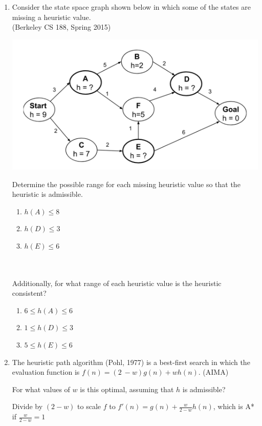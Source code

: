 \documentclass[11pt]{article}
\begin{document}
\begin{enumerate}
\newpage
\item
Consider the state space graph shown below in which some of the states are
missing a heuristic value.  \\(Berkeley CS 188, Spring 2015)


\includegraphics[width=\textwidth]{img/Heuristics}

Determine the possible range for each missing heuristic value so that the heuristic is admissible. 
~\\
\begin{enumerate}
\color{blue}
\item $h(A) \le 8$

\item $h(D) \le 3$

\item $h(E) \le 6$
\end{enumerate}
~\\ \\
Additionally, for what range of each heuristic value is the heuristic consistent? 
~\\
\begin{enumerate}
\color{blue}
\item $6 \le h(A) \le 6$
\item $1 \le h(D) \le 3$
\item $5 \le h(E) \le 6$

\end{enumerate}

\newpage
\item
The heuristic path algorithm (Pohl, 1977) is a best-first search in which the evaluation
function is $f(n) = (2 ~ -w)g(n) + wh(n)$. (AIMA)

For what values of $w$ is this optimal, assuming that $h$ is admissible?

{\color{blue}
Divide by $(2 - w)$ to scale $f$ to $f'(n) = g(n) + \frac{w}{2 - w}h(n)$,
which is A* if $\frac{w}{2 - w} = 1$

}
\end{enumerate}
\end{document}
